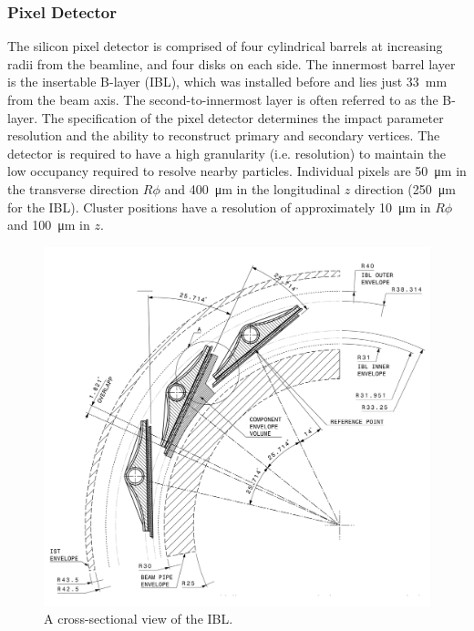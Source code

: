 \subsubsection{Pixel Detector}
The silicon pixel detector is comprised of four cylindrical barrels at increasing radii from the beamline, and four disks on each side.
The innermost barrel layer is the insertable B-layer (IBL), which was installed before \runtwo \cite{ATLAS-TDR-19,PIX-2018-001} and lies just \SI{33}{\milli\meter} from the beam axis.
The second-to-innermost layer is often referred to as the B-layer.
The specification of the pixel detector determines the impact parameter resolution and the ability to reconstruct primary and secondary vertices.
The detector is required to have a high granularity (i.e. resolution) to maintain the low occupancy required to resolve nearby particles. %
Individual pixels are \SI{50}{\micro\meter} in the transverse direction $R\phi$ and \SI{400}{\micro\meter} in the longitudinal $z$ direction (\SI{250}{\micro\meter} for the IBL).
Cluster positions have a resolution of approximately \SI{10}{\micro\meter} in $R\phi$ and \SI{100}{\micro\meter} in $z$.


\begin{figure}[!htpb]
  \centering
  \includegraphics[width=0.6\linewidth]{chapters/2.detector/figs/atlas_ibl.png}
  \caption{A cross-sectional view of the \ATLAS IBL.}
  \label{fig:atlas_ibl}
\end{figure}

